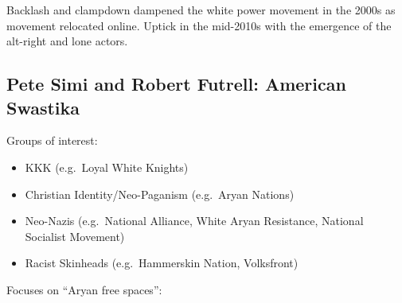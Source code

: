 \documentclass[
]{article}
\begin{document}
Backlash and clampdown dampened the white power movement in the 2000s as
movement relocated online. Uptick in the mid-2010s with the emergence of
the alt-right and lone actors.

\hypertarget{pete-simi-and-robert-futrell-american-swastika}{%
\subsection{Pete Simi and Robert Futrell: American
Swastika}\label{pete-simi-and-robert-futrell-american-swastika}}

Groups of interest:

\begin{itemize}
\item
  KKK (e.g.~Loyal White Knights)
\item
  Christian Identity/Neo-Paganism (e.g.~Aryan Nations)
\item
  Neo-Nazis (e.g.~National Alliance, White Aryan Resistance, National
  Socialist Movement)
\item
  Racist Skinheads (e.g.~Hammerskin Nation, Volksfront)
\end{itemize}

Focuses on ``Aryan free spaces'':
\end{document}
